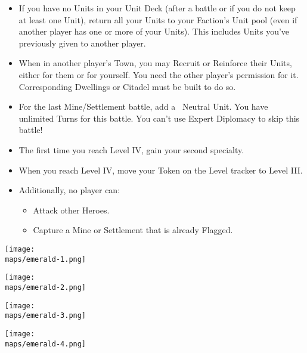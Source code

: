 \begin{multicols}{2}
\begin{itemize}
    \item If you have no Units in your Unit Deck (after a battle or if you do not keep at least one Unit), return all your Units to your Faction's Unit pool (even if another player has one or more of your Units). This includes Units you've previously given to another player.

    \item When in another player's Town, you may Recruit or Reinforce their Units, either for them or for yourself. You need the other player's permission for it. Corresponding Dwellings or Citadel must be built to do so.

    \item For the last Mine/Settlement battle, add a \golden\ Neutral Unit. You have unlimited Turns for this battle. You can't use Expert Diplomacy to skip this battle!

    \item The first time you reach Level IV, gain your second specialty.

    \item When you reach Level IV, move your Token on the Level tracker to Level III.

    \item Additionally, no player can:
    \begin{itemize}
        \item Attack other Heroes.
        \item Capture a Mine or Settlement that is already Flagged.
    \end{itemize}
\end{itemize}

\end{multicols}

\vfill
\begin{minipage}{0.4\paperwidth}
  \centering
  \texttt{[image: \\maps/emerald-1.png]}
\end{minipage}
\begin{minipage}{0.4\paperwidth}
  \centering
  \texttt{[image: \\maps/emerald-2.png]}
\end{minipage}
\vfill
\begin{minipage}{0.4\paperwidth}
  \hfill
  \texttt{[image: \\maps/emerald-3.png]}
\end{minipage}
\begin{minipage}{0.4\paperwidth}
  \vspace{1em}
  \hfill
  \texttt{[image: \\maps/emerald-4.png]}
\end{minipage}
\vfill
